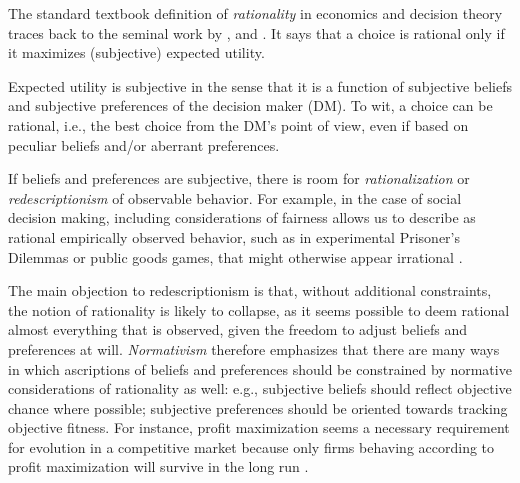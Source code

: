 \documentclass[fleqn,reqno,12pt]{article}
\theoremstyle{Satz}
\theoremstyle{Bsp}
\begin{document}
The standard textbook definition of \textit{rationality} in economics and decision theory
traces back to the seminal work by \citet{deFinetti37}, \citet{Neumannvon-NeumannMorgenstern1944:Theory-of-Games}
and \citet{Savage1954:The-Foundations}. It says that a choice is rational only if it maximizes
(subjective) expected utility.


\noindent Expected utility is subjective in the sense that it is a function of subjective
beliefs and subjective preferences of the decision maker (DM). To wit, a choice can be
rational, i.e., the best choice from the DM's point of view, even if based on peculiar beliefs
and/or aberrant preferences. %

If beliefs and preferences are subjective, there is room for \emph{rationalization} or
\emph{redescriptionism} of observable behavior. For example,
in the case of social decision making, including considerations of fairness allows us to
describe as rational empirically observed behavior, such as in experimental Prisoner's Dilemmas
or public goods games, that might otherwise appear irrational
\citep[e.g.,][]{fehrschmidt99,charrab02}.

The main objection to redescriptionism is that, without additional constraints, the notion of
rationality is likely to collapse, as it seems possible to deem rational almost everything that
is observed, given the freedom to adjust beliefs and preferences at will. \emph{Normativism}
therefore emphasizes that there are many ways in which ascriptions of beliefs and preferences
should be constrained by normative considerations of rationality as well: e.g., subjective
beliefs should reflect objective chance where possible; subjective preferences should be
oriented towards tracking objective fitness. For instance, profit maximization seems a
necessary requirement for evolution in a competitive market because only firms behaving
according to profit maximization will survive in the long run \citep[e.g.,][]{alch50,Fried53}.
\end{document}
